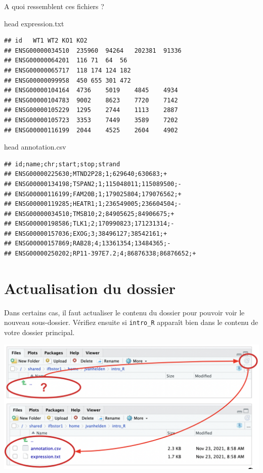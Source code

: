 \documentclass[
]{book}
\newenvironment{Shaded}{\begin{snugshade}}{\end{snugshade}}
\newcommand{\FunctionTok}[1]{\textcolor[rgb]{0.00,0.00,0.00}{#1}}
\newcommand{\NormalTok}[1]{#1}
\begin{document}
A quoi ressemblent ces fichiers ?

\begin{Shaded}
\begin{Highlighting}[]
\FunctionTok{head}\NormalTok{ expression.txt}
\end{Highlighting}
\end{Shaded}

\begin{verbatim}
## id   WT1 WT2 KO1 KO2
## ENSG00000034510  235960  94264   202381  91336
## ENSG00000064201  116 71  64  56
## ENSG00000065717  118 174 124 182
## ENSG00000099958  450 655 301 472
## ENSG00000104164  4736    5019    4845    4934
## ENSG00000104783  9002    8623    7720    7142
## ENSG00000105229  1295    2744    1113    2887
## ENSG00000105723  3353    7449    3589    7202
## ENSG00000116199  2044    4525    2604    4902
\end{verbatim}

\begin{Shaded}
\begin{Highlighting}[]
\FunctionTok{head}\NormalTok{ annotation.csv}
\end{Highlighting}
\end{Shaded}

\begin{verbatim}
## id;name;chr;start;stop;strand
## ENSG00000225630;MTND2P28;1;629640;630683;+
## ENSG00000134198;TSPAN2;1;115048011;115089500;-
## ENSG00000116199;FAM20B;1;179025804;179076562;+
## ENSG00000119285;HEATR1;1;236549005;236604504;-
## ENSG00000034510;TMSB10;2;84905625;84906675;+
## ENSG00000198586;TLK1;2;170990823;171231314;-
## ENSG00000157036;EXOG;3;38496127;38542161;+
## ENSG00000157869;RAB28;4;13361354;13484365;-
## ENSG00000250202;RP11-397E7.2;4;86876338;86876652;+
\end{verbatim}

\hypertarget{actualisation-du-dossier}{%
\section{Actualisation du dossier}\label{actualisation-du-dossier}}

Dans certains cas, il faut actualiser le contenu du dossier pour pouvoir voir le nouveau sous-dossier.
Vérifiez ensuite si \texttt{intro\_R} apparaît bien dans le contenu de votre dossier principal.

\includegraphics{images/actualiser.png}
\end{document}
